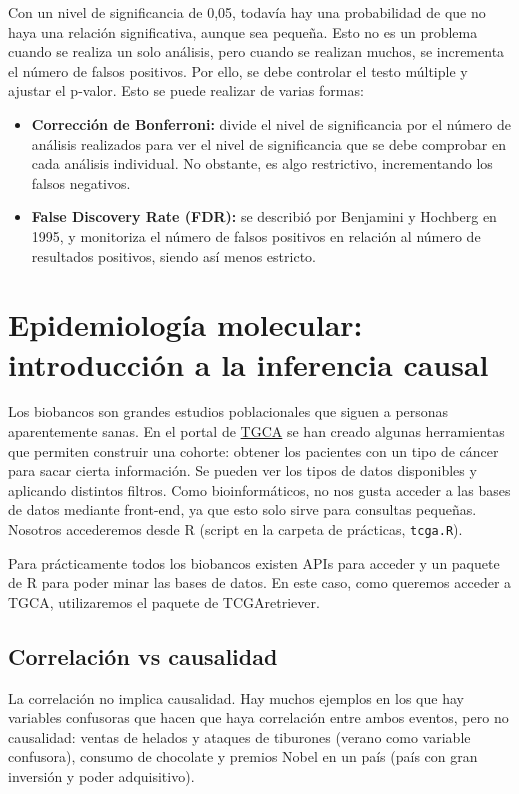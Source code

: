 Con un nivel de significancia de 0,05, todavía hay una probabilidad de que no haya una relación significativa, aunque sea pequeña. Esto no es un problema cuando se realiza un solo análisis, pero cuando se realizan muchos, se incrementa el número de falsos positivos. Por ello, se debe controlar el testo múltiple y ajustar el p-valor. Esto se puede realizar de varias formas:
\begin{itemize}
\item \textbf{Corrección de Bonferroni:} divide el nivel de significancia por el número de análisis realizados para ver el nivel de significancia que se debe comprobar en cada análisis individual. No obstante, es algo restrictivo, incrementando los falsos negativos.
\item \textbf{False Discovery Rate (FDR):} se describió por Benjamini y Hochberg en 1995, y monitoriza el número de falsos positivos en relación al número de resultados positivos, siendo así menos estricto.
\end{itemize}

\chapter{Epidemiología molecular: introducción a la inferencia causal}
Los biobancos son grandes estudios poblacionales que siguen a personas aparentemente sanas. En el portal de \href{https://portal.gdc.cancer.gov/analysis_page?app=}{TGCA} se han creado algunas herramientas que permiten construir una cohorte: obtener los pacientes con un tipo de cáncer para sacar cierta información. Se pueden ver los tipos de datos disponibles y aplicando distintos filtros. Como bioinformáticos, no nos gusta acceder a las bases de datos mediante front-end, ya que esto solo sirve para consultas pequeñas. Nosotros accederemos desde R (script en la carpeta de prácticas, \texttt{tcga.R}).

Para prácticamente todos los biobancos existen APIs para acceder y un paquete de R para poder minar las bases de datos. En este caso, como queremos acceder a TGCA, utilizaremos el paquete de TCGAretriever.

 \section{Correlación vs causalidad}
 La correlación no implica causalidad. Hay muchos ejemplos en los que hay variables confusoras que hacen que haya correlación entre ambos eventos, pero no causalidad: ventas de helados y ataques de tiburones (verano como variable confusora), consumo de chocolate y premios Nobel en un país (país con gran inversión y poder adquisitivo). 
 
